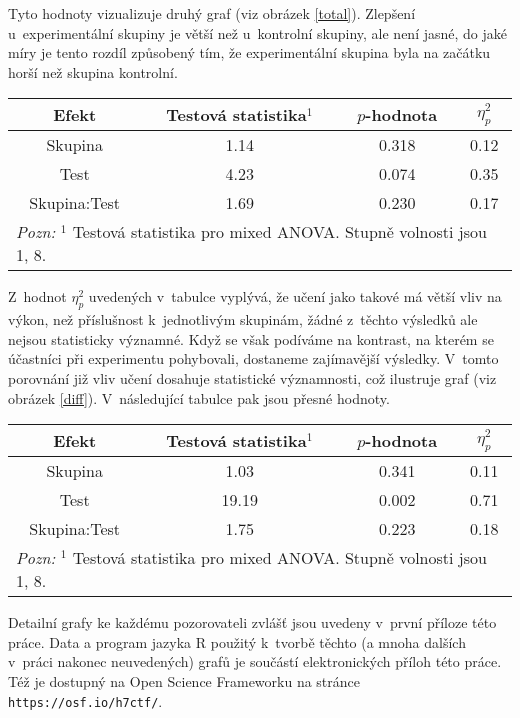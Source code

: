 
Tyto hodnoty vizualizuje druhý graf (viz obrázek \ref{total}). Zlepšení
u~experimentální skupiny je větší než u~kontrolní skupiny, ale není jasné, do
jaké míry je tento rozdíl způsobený tím, že experimentální skupina byla na začátku
horší než skupina kontrolní. 

\begin{center}
\begin{tabular}{cccc}
\hline\hline
       Efekt & Testová statistika$^1$&$p$-hodnota & $\eta^2_p$ \\
\hline                                            
       Skupina&   1.14& 0.318 & 0.12 \\ 
       Test &   4.23& 0.074 & 0.35 \\ 
 Skupina:Test&   1.69& 0.230 & 0.17 \\ 
\hline\hline
\multicolumn{4}{l}{\footnotesize \textit{Pozn:}
$^1$ Testová statistika pro mixed ANOVA. Stupně volnosti jsou 1, 8.}

\end{tabular}
\end{center}

Z~hodnot $\eta^2_p$ uvedených v~tabulce vyplývá, že učení jako takové má větší vliv na výkon, než příslušnost k~jednotlivým skupinám, žádné z~těchto výsledků ale nejsou statisticky významné. Když se však podíváme na kontrast, na kterém se účastníci při experimentu pohybovali, dostaneme zajímavější výsledky. V~tomto porovnání již vliv učení dosahuje statistické významnosti, což ilustruje graf (viz obrázek \ref{diff}). V~následující tabulce pak jsou přesné hodnoty.

\begin{center}
\begin{tabular}{cccc}
\hline\hline
       Efekt & Testová statistika$^1$&$p$-hodnota & $\eta^2_p$ \\
\hline                                         
       Skupina&       1.03& 0.341&   0.11    \\
      Test&     19.19& 0.002&  0.71  \\
 Skupina:Test&      1.75& 0.223&  0.18       \\

\hline\hline
\multicolumn{4}{l}{\footnotesize \textit{Pozn:}
$^1$ Testová statistika pro mixed ANOVA. Stupně volnosti jsou 1, 8.}


\end{tabular}
\end{center}




Detailní grafy ke každému pozorovateli zvlášť jsou uvedeny v~první příloze této práce.
Data a program jazyka R použitý k~tvorbě těchto (a mnoha dalších v~práci nakonec neuvedených) grafů je součástí
elektronických příloh této práce. Též je dostupný na Open Science Frameworku na stránce {\tt https://osf.io/h7ctf/}.

